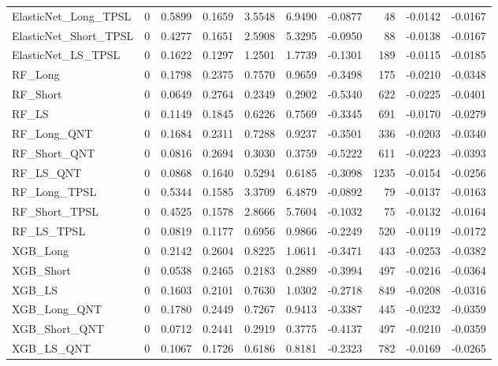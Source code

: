 \begin{tabular}{llrrrrrrrr}
\cline{1-10}
ElasticNet\_Long\_TPSL & 0 & 0.5899 & 0.1659 & 3.5548 & 6.9490 & -0.0877 & 48 & -0.0142 & -0.0167 \\
\cline{1-10}
ElasticNet\_Short\_TPSL & 0 & 0.4277 & 0.1651 & 2.5908 & 5.3295 & -0.0950 & 88 & -0.0138 & -0.0167 \\
\cline{1-10}
ElasticNet\_LS\_TPSL & 0 & 0.1622 & 0.1297 & 1.2501 & 1.7739 & -0.1301 & 189 & -0.0115 & -0.0185 \\
\cline{1-10}
RF\_Long & 0 & 0.1798 & 0.2375 & 0.7570 & 0.9659 & -0.3498 & 175 & -0.0210 & -0.0348 \\
\cline{1-10}
RF\_Short & 0 & 0.0649 & 0.2764 & 0.2349 & 0.2902 & -0.5340 & 622 & -0.0225 & -0.0401 \\
\cline{1-10}
RF\_LS & 0 & 0.1149 & 0.1845 & 0.6226 & 0.7569 & -0.3345 & 691 & -0.0170 & -0.0279 \\
\cline{1-10}
RF\_Long\_QNT & 0 & 0.1684 & 0.2311 & 0.7288 & 0.9237 & -0.3501 & 336 & -0.0203 & -0.0340 \\
\cline{1-10}
RF\_Short\_QNT & 0 & 0.0816 & 0.2694 & 0.3030 & 0.3759 & -0.5222 & 611 & -0.0223 & -0.0393 \\
\cline{1-10}
RF\_LS\_QNT & 0 & 0.0868 & 0.1640 & 0.5294 & 0.6185 & -0.3098 & 1235 & -0.0154 & -0.0256 \\
\cline{1-10}
RF\_Long\_TPSL & 0 & 0.5344 & 0.1585 & 3.3709 & 6.4879 & -0.0892 & 79 & -0.0137 & -0.0163 \\
\cline{1-10}
RF\_Short\_TPSL & 0 & 0.4525 & 0.1578 & 2.8666 & 5.7604 & -0.1032 & 75 & -0.0132 & -0.0164 \\
\cline{1-10}
RF\_LS\_TPSL & 0 & 0.0819 & 0.1177 & 0.6956 & 0.9866 & -0.2249 & 520 & -0.0119 & -0.0172 \\
\cline{1-10}
XGB\_Long & 0 & 0.2142 & 0.2604 & 0.8225 & 1.0611 & -0.3471 & 443 & -0.0253 & -0.0382 \\
\cline{1-10}
XGB\_Short & 0 & 0.0538 & 0.2465 & 0.2183 & 0.2889 & -0.3994 & 497 & -0.0216 & -0.0364 \\
\cline{1-10}
XGB\_LS & 0 & 0.1603 & 0.2101 & 0.7630 & 1.0302 & -0.2718 & 849 & -0.0208 & -0.0316 \\
\cline{1-10}
XGB\_Long\_QNT & 0 & 0.1780 & 0.2449 & 0.7267 & 0.9413 & -0.3387 & 445 & -0.0232 & -0.0359 \\
\cline{1-10}
XGB\_Short\_QNT & 0 & 0.0712 & 0.2441 & 0.2919 & 0.3775 & -0.4137 & 497 & -0.0210 & -0.0359 \\
\cline{1-10}
XGB\_LS\_QNT & 0 & 0.1067 & 0.1726 & 0.6186 & 0.8181 & -0.2323 & 782 & -0.0169 & -0.0265 \\

\end{tabular}
